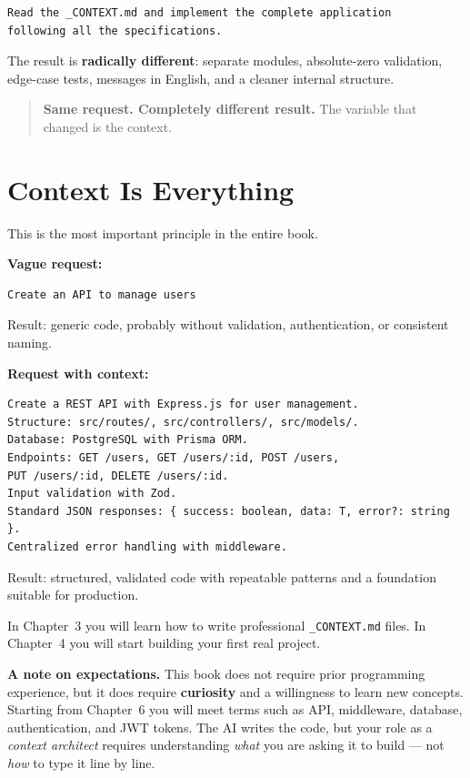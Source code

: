 \begin{lstlisting}[language={}]
Read the _CONTEXT.md and implement the complete application
following all the specifications.
\end{lstlisting}

The result is \textbf{radically different}: separate modules, absolute-zero validation, edge-case tests, messages in English, and a cleaner internal structure.

\begin{quote}
\textbf{Same request. Completely different result.} The variable that changed is the context.
\end{quote}

\section{Context Is Everything}

This is the most important principle in the entire book.

\textbf{Vague request:}
\begin{lstlisting}[language={}]
Create an API to manage users
\end{lstlisting}

Result: generic code, probably without validation, authentication, or consistent naming.

\textbf{Request with context:}
\begin{lstlisting}[language={}]
Create a REST API with Express.js for user management.
Structure: src/routes/, src/controllers/, src/models/.
Database: PostgreSQL with Prisma ORM.
Endpoints: GET /users, GET /users/:id, POST /users,
PUT /users/:id, DELETE /users/:id.
Input validation with Zod.
Standard JSON responses: { success: boolean, data: T, error?: string }.
Centralized error handling with middleware.
\end{lstlisting}

Result: structured, validated code with repeatable patterns and a foundation suitable for production.

In Chapter~3 you will learn how to write professional \texttt{\_CONTEXT.md} files. In Chapter~4 you will start building your first real project.

\begin{warnbox}
\textbf{A note on expectations.} This book does not require prior programming experience, but it does require \textbf{curiosity} and a willingness to learn new concepts. Starting from Chapter~6 you will meet terms such as API, middleware, database, authentication, and JWT tokens. The AI writes the code, but your role as a \emph{context architect} requires understanding \emph{what} you are asking it to build --- not \emph{how} to type it line by line.
\end{warnbox}

